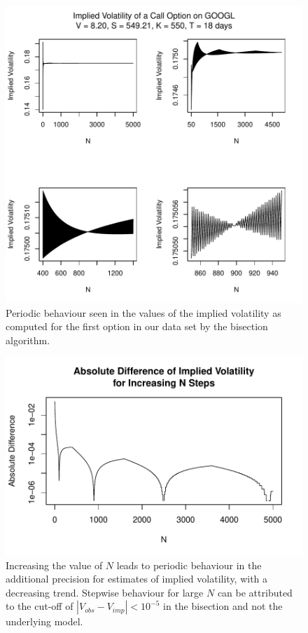 \documentclass[12pt]{article}
\begin{document}
\begin{figure}[H]
	\centering
 	\includegraphics[scale=0.75]{../plots/imp_vol_conv.pdf}
\caption{\footnotesize Periodic behaviour seen in the values of the implied volatility as computed for the first option in our data set by the bisection algorithm.}
\end{figure}

\begin{figure}[H]
	\centering
 	\includegraphics[scale=0.52]{../plots/imp_vol_conv_diff.pdf}
\caption{\footnotesize Increasing the value of $N$ leads to periodic behaviour in the additional precision for estimates of implied volatility, with a decreasing trend. Stepwise behaviour for large $N$ can be attributed to the cut-off of $|V_{obs} - V_{imp}| < 10^{-5}$ in the bisection and not the underlying model.}
\end{figure}
\end{document}
